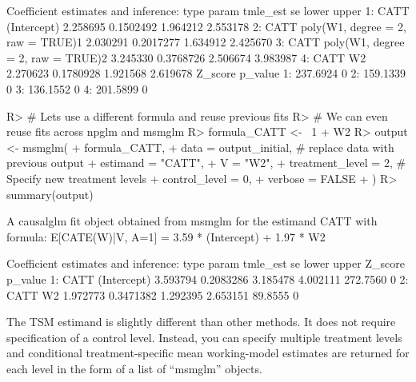 \documentclass[
]{jss}
\begin{document}
\begin{CodeChunk}
\begin{CodeOutput}
Coefficient estimates and inference:
   type                             param tmle_est        se    lower    upper
1: CATT                       (Intercept) 2.258695 0.1502492 1.964212 2.553178
2: CATT poly(W1, degree = 2, raw = TRUE)1 2.030291 0.2017277 1.634912 2.425670
3: CATT poly(W1, degree = 2, raw = TRUE)2 3.245330 0.3768726 2.506674 3.983987
4: CATT                                W2 2.270623 0.1780928 1.921568 2.619678
    Z_score p_value
1: 237.6924       0
2: 159.1339       0
3: 136.1552       0
4: 201.5899       0
\end{CodeOutput}
\begin{CodeInput}
R> # Lets use a different formula and reuse previous fits
R> # We can even reuse fits across npglm and msmglm
R> formula_CATT <- ~1 + W2  
R> output <- msmglm(
+       formula_CATT, 
+       data = output_initial, # replace data with previous output
+       estimand = "CATT", 
+       V = "W2",
+       treatment_level = 2,  # Specify new treatment levels
+       control_level = 0,
+       verbose = FALSE
+       )
R> summary(output)
\end{CodeInput}
\begin{CodeOutput}
A causalglm fit object obtained from msmglm for the estimand CATT with formula: 
E[CATE(W)|V, A=1] = 3.59 * (Intercept) + 1.97 * W2

Coefficient estimates and inference:
   type       param tmle_est        se    lower    upper  Z_score p_value
1: CATT (Intercept) 3.593794 0.2083286 3.185478 4.002111 272.7560       0
2: CATT          W2 1.972773 0.3471382 1.292395 2.653151  89.8555       0
\end{CodeOutput}
\end{CodeChunk}

The TSM estimand is slightly different than other methods. It does not
require specification of a control level. Instead, you can specify
multiple treatment levels and conditional treatment-specific mean
working-model estimates are returned for each level in the form of a
list of ``msmglm'' objects.
\end{document}
